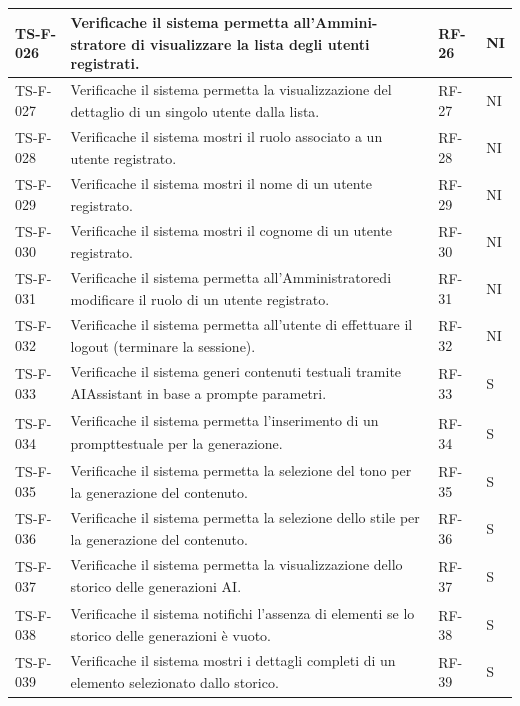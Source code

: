 \documentclass[a4paper,11pt]{article}
\renewcommand{\G}{\texorpdfstring{\textsubscript{\scalebox{0.6}{\textbf{G}}}\xspace}{ G}}
\begin{document}
\begin{longtable}{|p{2.2cm}|p{8.3cm}|p{2cm}|p{1.5cm}|}
TS-F-026 & Verifica\G che il sistema permetta all'Ammini-
stratore di visualizzare la lista degli utenti
registrati. & RF-26 & NI \\ \hline
TS-F-027 & Verifica\G che il sistema permetta la visualizzazione
del dettaglio di un singolo utente dalla lista. & RF-27 & NI \\ \hline
TS-F-028 & Verifica\G che il sistema mostri il ruolo associato a
un utente registrato. & RF-28 & NI \\ \hline
TS-F-029 & Verifica\G che il sistema mostri il nome di un
utente registrato. & RF-29 & NI \\ \hline
TS-F-030 & Verifica\G che il sistema mostri il cognome di un
utente registrato. & RF-30 & NI \\ \hline
TS-F-031 & Verifica\G che il sistema permetta all'Amministratore\G di modificare il ruolo di un utente
registrato. & RF-31 & NI \\ \hline
TS-F-032 & Verifica\G che il sistema permetta all’utente di
effettuare il logout (terminare la sessione). & RF-32 & NI \\ \hline
TS-F-033 & Verifica\G che il sistema generi contenuti testuali
tramite AI\G Assistant in base a prompt\G e
parametri. & RF-33 & S \\ \hline
TS-F-034 & Verifica\G che il sistema permetta l’inserimento di un prompt\G testuale per la generazione. & RF-34 & S \\ \hline
TS-F-035 & Verifica\G che il sistema permetta la selezione del
tono per la generazione del contenuto. & RF-35 & S \\ \hline
TS-F-036 & Verifica\G che il sistema permetta la selezione dello
stile per la generazione del contenuto. & RF-36 & S \\ \hline
TS-F-037 & Verifica\G che il sistema permetta la visualizzazione
dello storico delle generazioni AI\G. & RF-37 & S \\ \hline
TS-F-038 & Verifica\G che il sistema notifichi l’assenza di elementi se lo storico delle generazioni è
vuoto. & RF-38 & S \\ \hline
TS-F-039 & Verifica\G che il sistema mostri i dettagli completi
di un elemento selezionato dallo storico. & RF-39 & S \\ \hline


\end{longtable}
\end{document}
